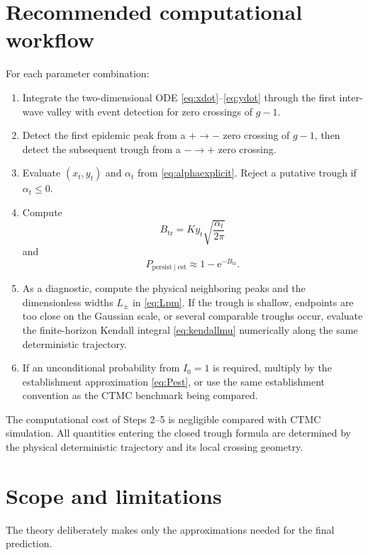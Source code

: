 \documentclass[11pt]{article}
\newcommand{\e}{\mathrm e}
\begin{document}
\section{Recommended computational workflow}

For each parameter combination:

\begin{enumerate}
\item Integrate the two-dimensional ODE \eqref{eq:xdot}--\eqref{eq:ydot} through the first inter-wave valley with event detection for zero crossings of \(g-1\).

\item Detect the first epidemic peak from a \(+\to-\) zero crossing of \(g-1\), then detect the subsequent trough from a \(-\to+\) zero crossing.

\item Evaluate \((x_t,y_t)\) and \(\alpha_t\) from \eqref{eq:alphaexplicit}. Reject a putative trough if \(\alpha_t\le0\).

\item Compute
\[
B_{\mathrm{tr}}=K y_t\sqrt{\frac{\alpha_t}{2\pi}}
\]
and
\[
P_{\mathrm{persist}\mid\mathrm{est}}\approx1-\e^{-B_{\mathrm{tr}}}.
\]

\item As a diagnostic, compute the physical neighboring peaks and the dimensionless widths \(L_\pm\) in \eqref{eq:Lpm}. If the trough is shallow, endpoints are too close on the Gaussian scale, or several comparable troughs occur, evaluate the finite-horizon Kendall integral \eqref{eq:kendallmu} numerically along the same deterministic trajectory.

\item If an unconditional probability from \(I_0=1\) is required, multiply by the establishment approximation \eqref{eq:Pest}, or use the same establishment convention as the CTMC benchmark being compared.
\end{enumerate}

The computational cost of Steps 2--5 is negligible compared with CTMC simulation. All quantities entering the closed trough formula are determined by the physical deterministic trajectory and its local crossing geometry.

\section{Scope and limitations}

The theory deliberately makes only the approximations needed for the final prediction.
\end{document}

